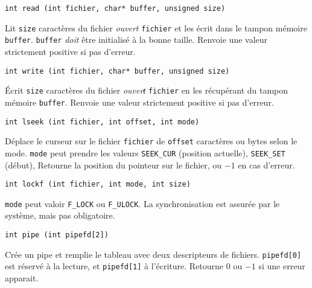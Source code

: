 \documentclass[a4paper]{article}
\begin{document}
\begin{multicols*}{2}
    \begin{lstlisting}
int read (int fichier, char* buffer, unsigned size)
    \end{lstlisting}
    Lit \texttt{size} caractères du fichier \emph{ouvert} \texttt{fichier} et les écrit dans le tampon mémoire \texttt{buffer}.
    \texttt{buffer} \emph{doit} être initialisé à la bonne taille. 
    Renvoie une valeur strictement positive si pas d'erreur.

    \begin{lstlisting}
int write (int fichier, char* buffer, unsigned size)
    \end{lstlisting}
    \'Ecrit \texttt{size} caractères du fichier \emph{ouverŧ} \texttt{fichier} en les récupérant du tampon mémoire \texttt{buffer}.
    Renvoie une valeur strictement positive si pas d'erreur.

    \begin{lstlisting}
int lseek (int fichier, int offset, int mode)
    \end{lstlisting}
    D\'eplace le curseur sur le fichier \texttt{fichier} de \texttt{offset} caractères ou bytes selon le mode.
    \texttt{mode} peut prendre les valeurs \texttt{SEEK\_CUR} (position actuelle), \texttt{SEEK\_SET} (début),
    Retourne la position du pointeur sur le fichier, ou $-1$ en cas d'erreur.

    \begin{lstlisting}
int lockf (int fichier, int mode, int size)
    \end{lstlisting}
    \texttt{mode} peut valoir \texttt{F\_LOCK} ou \texttt{F\_ULOCK}.
    La synchronisation est assurée par le système, mais pas obligatoire.

\begin{lstlisting}
int pipe (int pipefd[2])
\end{lstlisting}

Crée un pipe et remplie le tableau avec deux descripteurs de fichiers. \texttt{pipefd[0]} est réservé à la lecture, et \texttt{pipefd[1]} à l'écriture.
Retourne $0$ ou $-1$ si une erreur apparait.


\end{multicols*}
\end{document}
